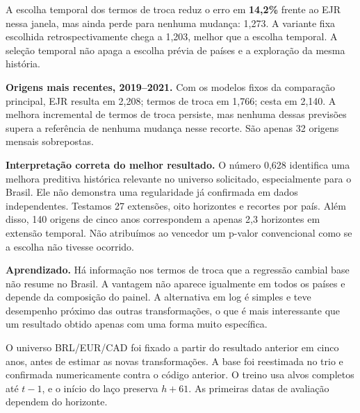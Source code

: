\documentclass[10pt,a4paper]{article}
\newcommand{\pagina}[1]{\clearpage{\Large\bfseries\color{navy} #1}\par\vspace{6pt}}
\begin{document}
A escolha temporal dos termos de troca reduz o erro em \textbf{14,2\%} frente ao EJR nessa janela, mas ainda perde para nenhuma mudança: 1,273. A variante fixa escolhida retrospectivamente chega a 1,203, melhor que a escolha temporal. A seleção temporal não apaga a escolha prévia de países e a exploração da mesma história.

\textbf{Origens mais recentes, 2019--2021.} Com os modelos fixos da comparação principal, EJR resulta em 2,208; termos de troca em 1,766; cesta em 2,140. A melhora incremental de termos de troca persiste, mas nenhuma dessas previsões supera a referência de nenhuma mudança nesse recorte. São apenas 32 origens mensais sobrepostas.

\textbf{Interpretação correta do melhor resultado.} O número 0,628 identifica uma melhora preditiva histórica relevante no universo solicitado, especialmente para o Brasil. Ele não demonstra uma regularidade já confirmada em dados independentes. Testamos 27 extensões, oito horizontes e recortes por país. Além disso, 140 origens de cinco anos correspondem a apenas 2,3 horizontes em extensão temporal. Não atribuímos ao vencedor um p-valor convencional como se a escolha não tivesse ocorrido.

\textbf{Aprendizado.} Há informação nos termos de troca que a regressão cambial base não resume no Brasil. A vantagem não aparece igualmente em todos os países e depende da composição do painel. A alternativa em log é simples e teve desempenho próximo das outras transformações, o que é mais interessante que um resultado obtido apenas com uma forma muito específica.

\pagina{7. Calendário, dados e integridade}
O universo BRL/EUR/CAD foi fixado a partir do resultado anterior em cinco anos, antes de estimar as novas transformações. A base foi reestimada no trio e confirmada numericamente contra o código anterior. O treino usa alvos completos até $t-1$, e o início do laço preserva $h+61$. As primeiras datas de avaliação dependem do horizonte.
\end{document}
